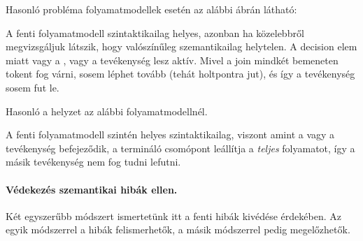 Hasonló probléma folyamatmodellek esetén az alábbi ábrán látható:


A fenti folyamatmodell szintaktikailag helyes, azonban ha közelebbről megvizsgáljuk látszik, hogy valószínűleg szemantikailag helytelen. A decision elem miatt vagy a , vagy a  tevékenység lesz aktív. Mivel a join mindkét bemeneten tokent fog várni, sosem léphet tovább (tehát holtpontra jut), és így a  tevékenység sosem fut le.

Hasonló a helyzet az alábbi folyamatmodellnél.

A fenti folyamatmodell szintén helyes szintaktikailag, viszont amint a  vagy a  tevékenység befejeződik, a termináló csomópont leállítja a \emph{teljes} folyamatot, így a másik tevékenység nem fog tudni lefutni.

\paragraph{Védekezés szemantikai hibák ellen.}
Két egyszerűbb módszert ismertetünk itt a fenti hibák kivédése érdekében. Az egyik módszerrel a hibák felismerhetők, a másik módszerrel pedig megelőzhetők.

